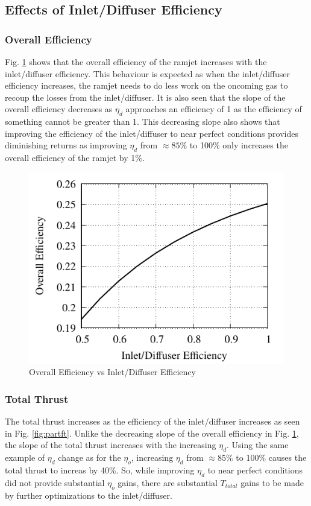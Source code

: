 \documentclass[conf]{new-aiaa} %
\begin{document}
\subsection{Effects of Inlet/Diffuser Efficiency} %

\subsubsection{Overall Efficiency}
Fig. \ref{fig:partfetao} shows that the overall efficiency of the ramjet increases with the inlet/diffuser efficiency. This behaviour is expected as when the inlet/diffuser efficiency increases, the ramjet needs to do less work on the oncoming gas to recoup the losses from the inlet/diffuser. It is also seen that the slope of the overall efficiency decreases as $\eta_d$ approaches an efficiency of 1 as the efficiency of something cannot be greater than 1. This decreasing slope also shows that improving the efficiency of the inlet/diffuser to near perfect conditions provides diminishing returns as improving $\eta_d$ from $\approx85\%$ to 100\% only increases the overall efficiency of the ramjet by 1\%.

\begin{figure}[H] %
    \centering
    \includegraphics[]{media/performance_parameter_files/part_f_eta_o.pdf}
    \caption{\label{fig:partfetao}Overall Efficiency vs Inlet/Diffuser Efficiency}
\end{figure}

\subsubsection{Total Thrust}
The total thrust increases as the efficiency of the inlet/diffuser increases as seen in Fig. \ref{fig:partft}. Unlike the decreasing slope of the overall efficiency in Fig. \ref{fig:partfetao}, the slope of the total thrust increases with the increasing $\eta_d$. Using the same example of $\eta_d$ change as for the $\eta_o$, increasing $\eta_d$ from $\approx85\%$ to 100\% causes the total thrust to increas by 40\%. So, while improving $\eta_d$ to near perfect conditions did not provide substantial $\eta_o$ gains, there are substantial $T_{total}$ gains to be made by further optimizations to the inlet/diffuser.
\end{document}
